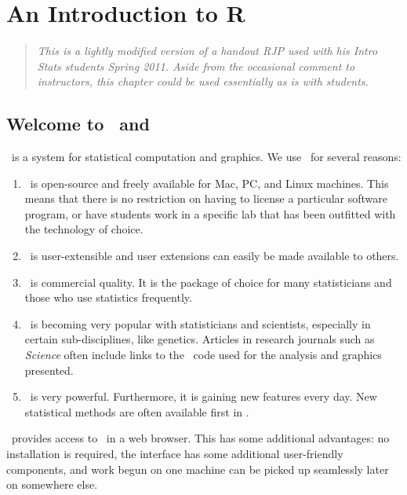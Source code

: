\chapter{An Introduction to R}






\begin{quote}
\emph{This is a lightly modified version of a handout RJP used with his 
Intro Stats students Spring 2011.  Aside from the occasional comment to
instructors, this chapter could be used essentially as is with students.}
\end{quote}

\label{app:StartingR}

\section{Welcome to \R\ and \Rstudio}

\R\ is a system for statistical computation and graphics.  We use \R\ for several reasons:
\begin{enumerate}
\item \R\ is open-source and freely available for Mac, PC, and Linux machines.
This means that there is no restriction on having to license a particular
software program, or have
students work in a specific lab that has been outfitted with the technology of choice.
\item \R\ is user-extensible and user extensions can easily be made available to others.
\item \R\ is commercial quality.  It is the package of choice for many statisticians and those
who use statistics frequently.  
\item \R\ is becoming very popular with statisticians and scientists, especially in certain
sub-disciplines, like genetics.  Articles in research journals such as \textit{Science} often
include links to the \R\ code used for the analysis and graphics presented.
\item
\R\ is very powerful.  Furthermore, it is gaining new features every day.  New statistical 
methods are often available first in \R.
\end{enumerate}

\Rstudio\ provides access to \R\ in a web browser.  This has some additional
advantages: no installation is required, the interface has some additional user-friendly components,
and work begun on one machine can be picked up seamlessly later on somewhere else.

